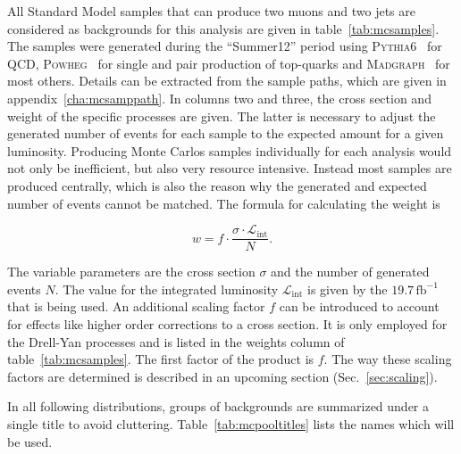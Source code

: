 
All Standard Model samples that can produce two muons and two jets are considered as backgrounds for this analysis are given in table~\ref{tab:mcsamples}. The samples were generated during the ``Summer12'' period using \textsc{Pythia6}~\cite{pythia6} for QCD, \textsc{Powheg}~\cite{powheg,powhegst,powhegtt} for single and pair production of top-quarks and \textsc{Madgraph}~\cite{madgraph5} for most others. Details can be extracted from the sample paths, which are given in appendix~\ref{cha:mcsamppath}. In columns two and three, the cross section and weight of the specific processes are given. The latter is necessary to adjust the generated number of events for each sample to the expected amount for a given luminosity. Producing Monte Carlos samples individually for each analysis would not only be inefficient, but also very resource intensive. Instead most samples are produced centrally, which is also the reason why the generated and expected number of events cannot be matched. The formula for calculating the weight is

\begin{equation}
  \label{eq:weight}
  w = f \cdot \frac{\sigma \cdot \mathcal{L}_{\text{int}}}{N}.
\end{equation}

\noindent The variable parameters are the cross section $\sigma$ and the number of generated events $N$. The value for the integrated luminosity $\mathcal{L}_{\text{int}}$ is given by the $19.7\,\text{fb}^{-1}$ that is being used. An additional scaling factor $f$ can be introduced to account for effects like higher order corrections to a cross section. It is only employed for the Drell-Yan processes and is listed in the weights column of table~\ref{tab:mcsamples}. The first factor of the product is $f$. The way these scaling factors are determined is described in an upcoming section (Sec.~\ref{sec:scaling}).

In all following distributions, groups of backgrounds are summarized under a single title to avoid cluttering. Table~\ref{tab:mcpooltitles} lists the names which will be used.

